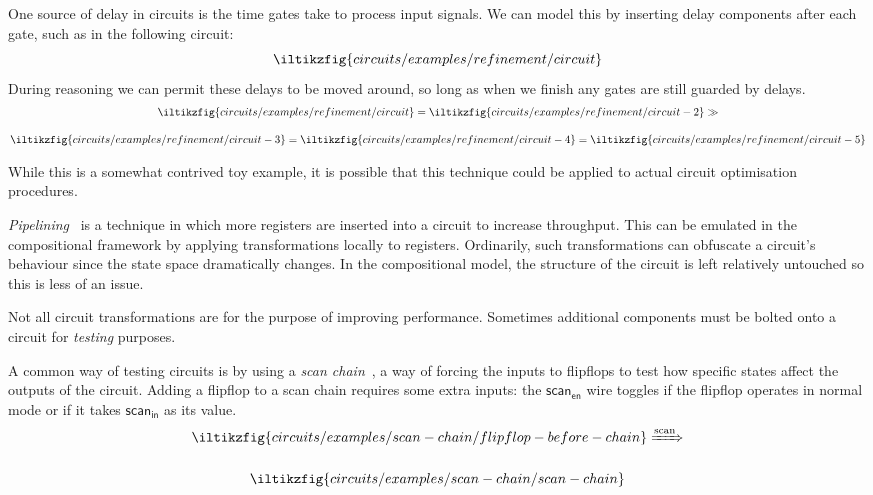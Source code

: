 \documentclass{lmcs}
\begin{document}
\begin{exa}
    One source of delay in circuits is the time gates take to process input
    signals.
    We can model this by inserting delay components after each gate, such as in
    the following circuit:
    \[
        \iltikzfig{circuits/examples/refinement/circuit}
    \]
    During reasoning we can permit these delays to be moved around, so long as
    when we finish any gates are still guarded by delays.
    \begin{gather*}
        \iltikzfig{circuits/examples/refinement/circuit}
        =
        \iltikzfig{circuits/examples/refinement/circuit-2}
        \gg
        \\[1em]
        \iltikzfig{circuits/examples/refinement/circuit-3}
        =
        \iltikzfig{circuits/examples/refinement/circuit-4}
        =
        \iltikzfig{circuits/examples/refinement/circuit-5}
    \end{gather*}
\end{exa}

While this is a somewhat contrived toy example, it is possible that this
technique could be applied to actual circuit optimisation procedures.

\begin{exa}[Pipelining]
    \emph{Pipelining}~\cite{parhi1999vlsi} is a technique in which more
    registers are inserted into a circuit to increase throughput.
    This can be emulated in the compositional framework by applying
    transformations locally to registers.
    Ordinarily, such transformations can obfuscate a circuit's behaviour since
    the state space dramatically changes.
    In the compositional model, the structure of the circuit is left relatively
    untouched so this is less of an issue.
\end{exa}

Not all circuit transformations are for the purpose of improving performance.
Sometimes additional components must be bolted onto a circuit for \emph{testing}
purposes.

\begin{exa}
    A common way of testing circuits is by using a
    \emph{scan chain}~\cite{mourad2000principles}, a way of forcing the
    inputs to flipflops to test how specific states affect the outputs of the
    circuit.
    Adding a flipflop to a scan chain requires some extra inputs: the
    \(\mathsf{scan}_\mathsf{en}\) wire toggles if the flipflop operates in
    normal mode or if it takes \(\mathsf{scan}_\mathsf{in}\) as its value.
    \begin{gather*}
        \iltikzfig{circuits/examples/scan-chain/flipflop-before-chain}
        \xRightarrow{\text{scan}}
        \\[1em]
        \iltikzfig{circuits/examples/scan-chain/scan-chain}
    \end{gather*}
\end{exa}
\end{document}
